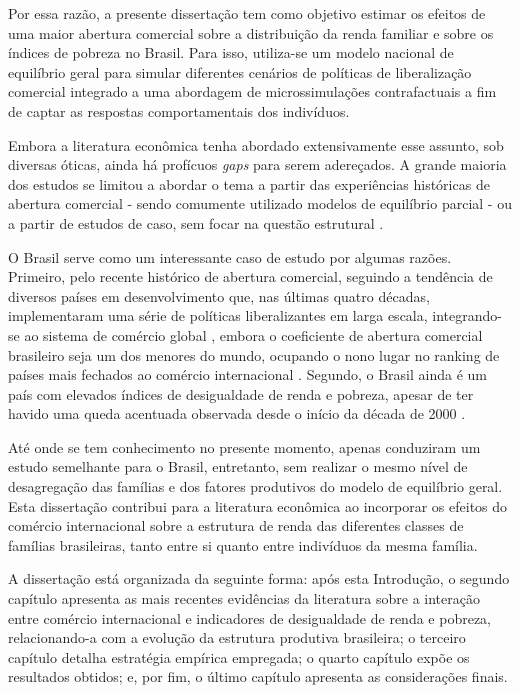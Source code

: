 Por essa razão, a presente dissertação tem como objetivo estimar os efeitos de uma maior abertura comercial sobre a distribuição da renda familiar e sobre os índices de pobreza no Brasil. Para isso, utiliza-se um modelo nacional de equilíbrio geral para simular diferentes cenários de políticas de liberalização comercial integrado a uma abordagem de microssimulações contrafactuais a fim de captar as respostas comportamentais dos indivíduos.

Embora a literatura econômica tenha abordado extensivamente esse assunto, sob diversas óticas, ainda há profícuos \textit{gaps} para serem adereçados. A grande maioria dos estudos se limitou a abordar o tema a partir das experiências históricas de abertura comercial - sendo comumente utilizado modelos de equilíbrio parcial \cite{castilho12, bayar17} - ou a partir de estudos de caso, sem focar na questão estrutural \cite{borrazetal12, estrades12, campostimini22}.

O Brasil serve como um interessante caso de estudo por algumas razões. Primeiro, pelo recente histórico de abertura comercial, seguindo a tendência de diversos países em desenvolvimento que, nas últimas quatro décadas, implementaram uma série de políticas liberalizantes em larga escala, integrando-se ao sistema de comércio global \cite{pavcnik17}, embora o coeficiente de abertura comercial brasileiro seja um dos menores do mundo, ocupando o nono lugar no ranking de países mais fechados ao comércio internacional \cite{ourworldindata}. Segundo, o Brasil ainda é um país com elevados índices de desigualdade de renda e pobreza, apesar de ter havido uma queda acentuada observada desde o início da década de 2000 \cite{ocde15}.

Até onde se tem conhecimento no presente momento, apenas \textcite{carneiro06, ferreira06} conduziram um estudo semelhante para o Brasil, entretanto, sem realizar o mesmo nível de desagregação das famílias e dos fatores produtivos do modelo de equilíbrio geral. Esta dissertação contribui para a literatura econômica ao incorporar os efeitos do comércio internacional sobre a estrutura de renda das diferentes classes de famílias brasileiras, tanto entre si quanto entre indivíduos da mesma família. 

A dissertação está organizada da seguinte forma: após esta Introdução, o segundo capítulo apresenta as mais recentes evidências da literatura sobre a interação entre comércio internacional e indicadores de desigualdade de renda e pobreza, relacionando-a com a evolução da estrutura produtiva brasileira; o terceiro capítulo detalha estratégia empírica empregada; o quarto capítulo expõe os resultados obtidos; e, por fim, o último capítulo apresenta as considerações finais.


